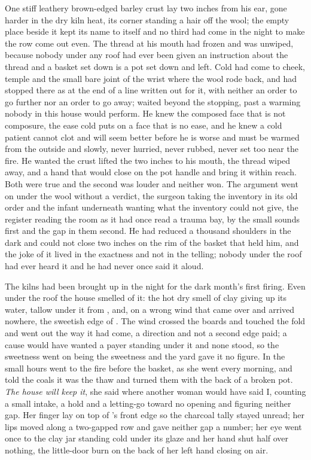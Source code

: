 One stiff leathery brown-edged barley crust lay two inches from his ear, gone harder in the dry kiln heat, its corner standing a hair off the wool; the empty place beside it kept its name to itself and no third had come in the night to make the row come out even. The thread at his mouth had frozen and was unwiped, because nobody under any roof had ever been given an instruction about the thread and a basket set down is a pot set down and left. Cold had come to cheek, temple and the small bare joint of the wrist where the wool rode back, and had stopped there as at the end of a line written out for it, with neither an order to go further nor an order to go away;  waited beyond the stopping, past a warming nobody in this house would perform. He knew the composed face that is not composure, the ease cold puts on a face that is no ease, and he knew a cold patient cannot clot and will seem better before he is worse and must be warmed from the outside and slowly, never hurried, never rubbed, never set too near the fire. He wanted the crust lifted the two inches to his mouth, the thread wiped away, and a hand that would close on the pot handle and bring it within reach. Both were true and the second was louder and neither won. The argument went on under the wool without a verdict, the surgeon taking the inventory in its old order and the infant underneath wanting what the inventory could not give, the register reading the room as it had once read a trauma bay, by the small sounds first and the gap in them second. He had reduced a thousand shoulders in the dark and could not close two inches on the rim of the basket that held him, and the joke of it lived in the exactness and not in the telling; nobody under the roof had ever heard it and he had never once said it aloud.

The kilns had been brought up in the night for the dark month's first firing. Even under the roof the house smelled of it: the hot dry smell of clay giving up its water, tallow under it from , and, on a wrong wind that came over  and arrived nowhere, the sweetish edge of . The wind crossed the boards and touched the fold and went out the way it had come, a direction and not a second edge paid; a cause would have wanted a payer standing under it and none stood, so the sweetness went on being the sweetness and the yard gave it no figure. In the small hours  went to the fire before the basket, as she went every morning, and told the coals it was the thaw and turned them with the back of a broken pot. \emph{The house will keep it}, she said where another woman would have said I, counting a small intake, a hold and a letting-go toward no opening and figuring neither gap. Her finger lay on top of 's front edge so the charcoal tally stayed unread; her lips moved along a two-gapped row and gave neither gap a number; her eye went once to the clay jar standing cold under its glaze and her hand shut half over nothing, the little-door burn on the back of her left hand closing on air.

